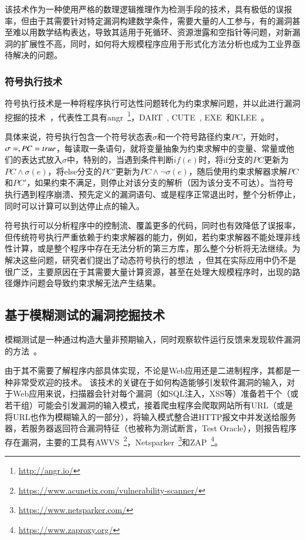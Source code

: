 该技术作为一种使用严格的数理逻辑推理作为检测手段的技术，具有极低的误报率，但由于其需要针对特定漏洞构建数学条件，需要大量的人工参与，有的漏洞甚至难以用数学结构表达，导致其适用于死循环、资源泄露和空指针等问题，对新漏洞的扩展性不高，同时，如何将大规模程序应用于形式化方法分析也成为工业界亟待解决的问题。 \\

\subsubsection{符号执行技术}
符号执行技术是一种将程序执行可达性问题转化为约束求解问题，并以此进行漏洞挖掘的技术~\cite{sym:sum}，代表性工具有angr~\footnote{\url{http://angr.io/}}，DART~\cite{sym:dart}, CUTE~\cite{sym:cute}, EXE~\cite{sym:exe}和KLEE~\cite{sym:klee}。

具体来说，符号执行包含一个符号状态表$\sigma$和一个符号路径约束$PC$，开始时，$\sigma=\empty, PC=true$，每读取一条语句，就将变量抽象为约束求解中的变量、常量或他们的表达式放入$\sigma$中，特别的，当遇到条件判断$if(e)$时，将if分支的$PC$更新为$PC \wedge \sigma(e)$，将else分支的$PC'$更新为$PC\wedge \neg\sigma(e)$，随后使用约束求解器求解$PC$和$PC'$，如果约束不满足，则停止对该分支的解析（因为该分支不可达）。当符号执行遇到程序崩溃、预先定义的漏洞语句、或是程序正常退出时，整个分析停止，同时可以计算可以到达停止点的输入。

符号执行可以分析程序中的控制流、覆盖更多的代码，同时也有效降低了误报率，但传统符号执行严重依赖于约束求解器的能力，例如，若约束求解器不能处理非线性计算，或是整个程序中存在无法分析的第三方库，那么整个分析将无法继续。为解决这些问题，研究者们提出了动态符号执行的想法~\cite{sym:dart,sym:cute,sym:exe,sym:klee}，但其在实际应用中仍不是很广泛，主要原因在于其需要大量计算资源，甚至在处理大规模程序时，出现的路径爆炸问题会导致约束求解无法产生结果。\\

\subsection{基于模糊测试的漏洞挖掘技术}
模糊测试是一种通过构造大量非预期输入，同时观察软件运行反馈来发现软件漏洞的方法~\cite{fuzzingstateofart}。

由于其不需要了解程序内部具体实现，不论是Web应用还是二进制程序，其都是一种非常受欢迎的技术。
该技术的关键在于如何构造能够引发软件漏洞的输入，对于Web应用来说，扫描器会针对每个漏洞（如SQL注入，XSS等）准备若干个（或若干组）可能会引发漏洞的输入模式，接着爬虫程序会爬取网站所有URL（或是将URL也作为模糊输入的一部分），将输入模式整合进HTTP报文中并发送给服务器，若服务器返回符合漏洞特征（也被称为测试断言，Test Oracle），则报告程序存在漏洞，主要的工具有AWVS~\footnote{\url{https://www.acunetix.com/vulnerability-scanner/}}，Netsparker~\footnote{\url{https://www.netsparker.com/}}和ZAP~\footnote{\url{https://www.zaproxy.org/}}。

